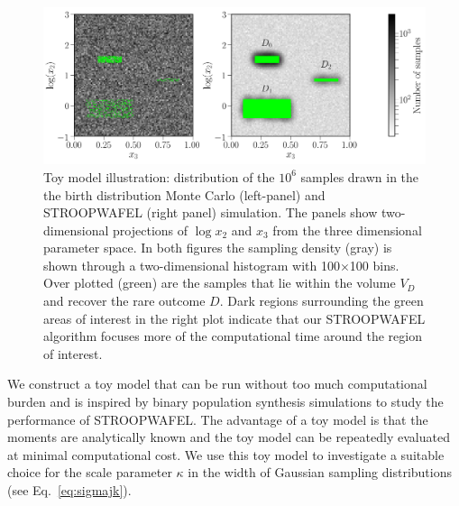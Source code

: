 \documentclass[a4paper,fleqn,usenatbib,useAMS,usedcolumn]{mnras}
\newcommand{\AISs}{\textsc{STROOPWAFEL}}
\begin{document}
%
\begin{figure}
\includegraphics[width=1\textwidth]{Modelislands.png}	 
\caption{Toy model illustration: distribution of the $10^6$ samples drawn in the  the birth distribution Monte Carlo (left-panel) and \AISs{}  (right panel) simulation.  The panels show two-dimensional projections of $\log x_2$ and $x_3$ from the three dimensional parameter space. In both figures the sampling density  (\textcolor{AISgray}{gray}) is shown through a two-dimensional histogram with 100$\times$100 bins. Over plotted  (\textcolor{AISgreen}{green}) are the samples that lie within the volume $V_D$ and recover the rare outcome $D$.  Dark regions surrounding the green areas of interest in the right plot indicate that our \AISs{} algorithm focuses more of the computational time around the region of interest.
\label{fig:app-3dslicedResult}
}
\end{figure}
%
We construct a toy model that can be run without too much computational burden and is inspired by binary population synthesis simulations to study the performance of \AISs. The advantage of a toy model is that the moments are analytically known and the toy model can be repeatedly evaluated at minimal computational cost.  We use this toy model to investigate a suitable choice for the scale parameter $\kappa$ in the width of Gaussian sampling distributions (see Eq.~\ref{eq:sigmajk}).
\end{document}
